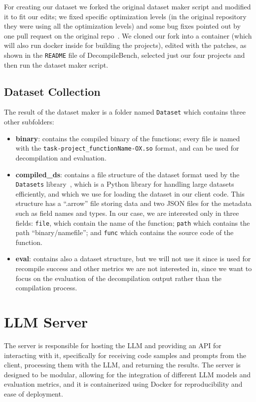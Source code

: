 For creating our dataset we forked the original dataset maker script and modified it to fit our edits; we fixed specific optimization levels (in the original repository they were using all the optimization levels) and some bug fixes pointed out by one pull request on the original repo~\cite{site:githubVarietyProblems}.
We cloned our fork into a container (which will also run docker inside for building the projects), edited with the patches, as shown in the \texttt{README} file of DecompileBench, selected just our four projects and then run the dataset maker script.

\subsection{Dataset Collection}
The result of the dataset maker is a folder named \texttt{Dataset} which contains three other subfolders:
\begin{itemize}
    \item \textbf{binary}: contains the compiled binary of the functions; every file is named with the \texttt{task-project\_functionName-OX.so} format, and can be used for decompilation and evaluation.
    \item \textbf{compiled\_ds}: contains a file structure of the dataset format used by the \texttt{Datasets} library~\cite{site:pypiDatasets}, which is a Python library for handling large datasets efficiently, and which we use for loading the dataset in our client code. 
        This structure has a ``.arrow'' file storing data and two \ac{JSON} files for the metadata such as field names and types. In our case, we are interested only in three fields: \texttt{file}, which contain the name of the function; \texttt{path} which contains the path ``binary/namefile''; and \texttt{func} which contains the source code of the function.
    \item \textbf{eval}: contains also a dataset structure, but we will not use it since is used for recompile success and other metrics we are not interested in, since we want to focus on the evaluation of the decompilation output rather than the compilation process.
\end{itemize}

\section{LLM Server}

The server is responsible for hosting the \ac{LLM} and providing an \ac{API} for interacting with it, specifically for receiving code samples and prompts from the client, processing them with the \ac{LLM}, and returning the results.
The server is designed to be modular, allowing for the integration of different \ac{LLM} models and evaluation metrics, and it is containerized using Docker for reproducibility and ease of deployment.

